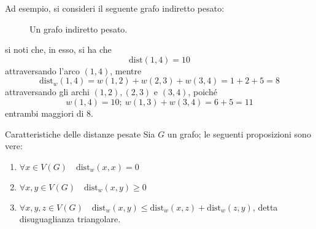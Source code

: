 \documentclass[a4paper, 12pt]{report}
\begin{document}
    \begin{example}
        Ad esempio, si consideri il seguente grafo indiretto pesato:

        \begin{figure}[H]
            \centering
            \caption{Un grafo indiretto pesato.}
        \end{figure}

        si noti che, in esso, si ha che $$\mathrm{dist}(1, 4) = 10$$ attraversando l'arco $(1, 4)$, mentre $$\mathrm{dist}_w(1, 4)=w(1, 2) + w(2, 3) + w(3, 4)=1 + 2 + 5 = 8$$ attraversando gli archi $(1, 2), (2, 3)$ e $(3, 4)$, poiché $$w(1, 4) = 10; \ w(1, 3) + w(3, 4) = 6 + 5 = 11$$ entrambi maggiori di $8$.
    \end{example}

    \begin{framedlem}[label={caratteristiche distanze pesate}]{Caratteristiche delle distanze pesate}
        Sia $G$ un grafo; le seguenti proposizioni sono vere:

        \begin{enumerate}[label=\roman*), font=\itshape]
            \item $\forall x \in V(G) \quad \mathrm{dist}_w(x, x) = 0$
            \item $\forall x, y \in V(G) \quad \mathrm{dist}_w(x, y) \ge 0$
            \item $\forall x, y, z \in V(G) \quad \mathrm{dist}_w(x, y) \le \mathrm{dist}_w(x, z) + \mathrm{dist}_w(z, y)$, detta \textup{disuguaglianza triangolare}.
        \end{enumerate}
    \end{framedlem}
\end{document}
